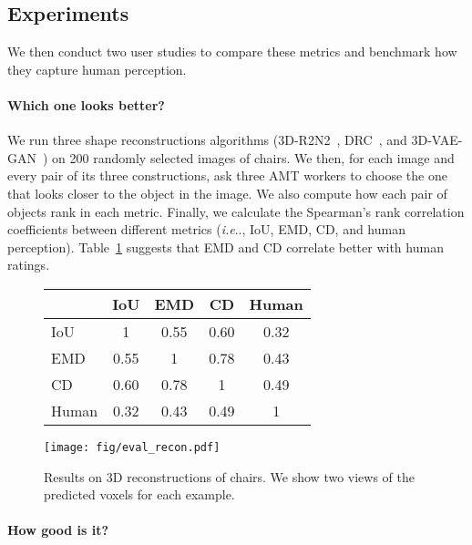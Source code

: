 \documentclass[10pt,twocolumn,letterpaper]{article}
\makeatletter
\newcommand{\tbl}[1]{Table~\ref{#1}}
\DeclareRobustCommand\onedot{\futurelet\@let@token\@onedot}
\def\@onedot{\ifx\@let@token.\else.\null\fi\xspace}
\def\ie{\emph{i.e}\onedot} \def\Ie{\emph{I.e}\onedot}
\newcommand{\myparagraph}[1]{\vspace{-14pt}\paragraph{#1}}
\makeatother
\begin{document}
\subsection{Experiments}

We then conduct two user studies to compare these metrics and benchmark how they capture human perception.

\myparagraph{Which one looks better?}
We run three shape reconstructions algorithms (3D-R2N2~\cite{Choy20163d}, DRC~\cite{Tulsiani2017Multi}, and 3D-VAE-GAN~\cite{Wu2016Learning}) on 200 randomly selected images of chairs.  We then, for each image and every pair of its three constructions, ask three AMT workers to choose the one that looks closer to the object in the image. We also compute how each pair of objects rank in each metric. Finally, we calculate the Spearman's rank correlation coefficients between different metrics (\ie, IoU, EMD, CD, and human perception). \tbl{tbl:metric_corr} suggests that EMD and CD correlate better with human ratings.

\begin{figure}[t]
\centering
    \begin{tabular}{lcccc}
    \toprule
     & IoU & EMD & CD & Human \\
    \midrule
    IoU & 1 & 0.55 & 0.60 & 0.32 \\
    EMD & 0.55 & 1 & 0.78 & 0.43 \\
    CD & 0.60 & 0.78 & 1 & 0.49 \\
    Human & 0.32 & 0.43 & 0.49 & 1 \\
    \bottomrule
    \end{tabular}
    \vspace{-5pt}
    \vspace{-15pt}
    \label{tbl:metric_corr}
\end{figure}
 
\begin{figure*}[t]
\centering
\texttt{[image: fig/eval\_recon.pdf]}
\vspace{-20pt}
\caption{Results on 3D reconstructions of chairs. We show two views of the predicted voxels for each example.}
\vspace{-15pt}
\label{fig:eval_recon}
\end{figure*}
 
\myparagraph{How good is it?}
\end{document}
